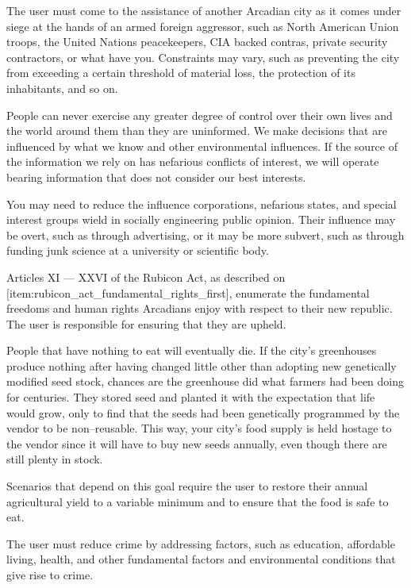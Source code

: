 
The user must come to the assistance of another Arcadian city as it comes under siege at the hands of an armed foreign aggressor, such as North American Union troops, the United Nations peacekeepers, CIA backed contras, private security contractors, or what have you. Constraints may vary, such as preventing the city from exceeding a certain threshold of material loss, the protection of its inhabitants, and so on.


People can never exercise any greater degree of control over their own lives and the world around them than they are uninformed. We make decisions that are influenced by what we know and other environmental influences. If the source of the information we rely on has nefarious conflicts of interest, we will operate bearing information that does not consider our best interests.

You may need to reduce the influence corporations, nefarious states, and special interest groups wield in socially engineering public opinion. Their influence may be overt, such as through advertising, or it may be more subvert, such as through funding junk science at a university or scientific body.


Articles XI --- XXVI of the Rubicon Act, as described on [item:rubicon_act_fundamental_rights_first], enumerate the fundamental freedoms and human rights Arcadians enjoy with respect to their new republic. The user is responsible for ensuring that they are upheld.


People that have nothing to eat will eventually die. If the city's greenhouses produce nothing after having changed little other than adopting new genetically modified seed stock, chances are the greenhouse did what farmers had been doing for centuries. They stored seed and planted it with the expectation that life would grow, only to find that the seeds had been genetically programmed by the vendor to be non--reusable. This way, your city's food supply is held hostage to the vendor since it will have to buy new seeds annually, even though there are still plenty in stock.

Scenarios that depend on this goal require the user to restore their annual agricultural yield to a variable minimum and to ensure that the food is safe to eat.


The user must reduce crime by addressing factors, such as education, affordable living, health, and other fundamental factors and environmental conditions that give rise to crime.

